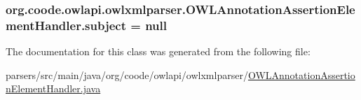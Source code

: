 \hypertarget{classorg_1_1coode_1_1owlapi_1_1owlxmlparser_1_1_o_w_l_annotation_assertion_element_handler_a1d5570b5846fde5b4b6b0e5a2cd42b07}{
\subsubsection[{subject}]{ org.\-coode.\-owlapi.\-owlxmlparser.\-O\-W\-L\-Annotation\-Assertion\-Element\-Handler.\-subject = null\hspace{0.3cm}{\ttfamily [private]}}}\label{classorg_1_1coode_1_1owlapi_1_1owlxmlparser_1_1_o_w_l_annotation_assertion_element_handler_a1d5570b5846fde5b4b6b0e5a2cd42b07}


The documentation for this class was generated from the following file\-:\begin{DoxyCompactItemize}
\item 
parsers/src/main/java/org/coode/owlapi/owlxmlparser/\hyperlink{_o_w_l_annotation_assertion_element_handler_8java}{O\-W\-L\-Annotation\-Assertion\-Element\-Handler.\-java}\end{DoxyCompactItemize}
